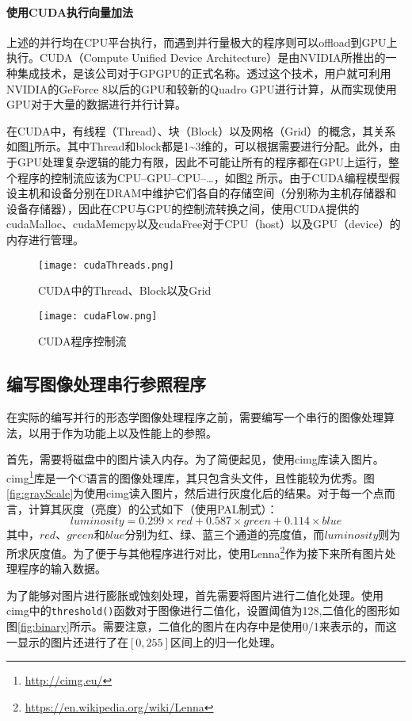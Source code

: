 \paragraph{使用CUDA执行向量加法}
\label{par:shi_yong_cudazhi_xing_xiang_liang_jia_fa_}
\par 上述的并行均在CPU平台执行，而遇到并行量极大的程序则可以offload到GPU上执行。CUDA（Compute Unified Device Architecture）是由NVIDIA所推出的一种集成技术，是该公司对于GPGPU的正式名称。透过这个技术，用户就可利用NVIDIA的GeForce 8以后的GPU和较新的Quadro GPU进行计算，从而实现使用GPU对于大量的数据进行并行计算。
\par 在CUDA中，有线程（Thread）、块（Block）以及网格（Grid）的概念，其关系如图\ref{fig:cudaThreads}所示。其中Thread和block都是1\textasciitilde 3维的，可以根据需要进行分配。此外，由于GPU处理复杂逻辑的能力有限，因此不可能让所有的程序都在GPU上运行，整个程序的控制流应该为CPU--GPU--CPU--\ldots ，如图\ref{fig:cudaFlow} 所示。由于CUDA编程模型假设主机和设备分别在DRAM中维护它们各自的存储空间（分别称为主机存储器和设备存储器），因此在CPU与GPU的控制流转换之间，使用CUDA提供的cudaMalloc、cudaMemcpy以及cudaFree对于CPU（host）以及GPU（device）的内存进行管理。
\begin{figure}[htpb]
    \centering
    \texttt{[image: cudaThreads.png]}
    \caption{CUDA中的Thread、Block以及Grid}
    \label{fig:cudaThreads}
\end{figure}
\begin{figure}[htpb]
    \centering
    \texttt{[image: cudaFlow.png]}
    \caption{CUDA程序控制流}
    \label{fig:cudaFlow}
\end{figure}


\subsection{编写图像处理串行参照程序}
\label{sub:bian_xie_tu_xiang_chu_li_chuan_xing_can_zhao_cheng_xu_}
\par 在实际的编写并行的形态学图像处理程序之前，需要编写一个串行的图像处理算法，以用于作为功能上以及性能上的参照。
\par 首先，需要将磁盘中的图片读入内存。为了简便起见，使用cimg库读入图片。cimg\footnote{\url{http://cimg.eu/}}库是一个C语言的图像处理库，其只包含头文件，且性能较为优秀。图\ref{fig:grayScale}为使用cimg读入图片，然后进行灰度化后的结果。对于每一个点而言，计算其灰度（亮度）的公式如下（使用PAL制式）：
\[ luminosity = 0.299\times red + 0.587\times green + 0.114\times blue \]
其中，\(red\)、\(green\)和\(blue\)分别为红、绿、蓝三个通道的亮度值，而\(luminosity\)则为所求灰度值。为了便于与其他程序进行对比，使用Lenna\footnote{\url{https://en.wikipedia.org/wiki/Lenna}}作为接下来所有图片处理程序的输入数据。
\par 为了能够对图片进行膨胀或蚀刻处理，首先需要将图片进行二值化处理。使用cimg中的\lstinline{threshold()}函数对于图像进行二值化，设置阈值为128,二值化的图形如图\ref{fig:binary}所示。需要注意，二值化的图片在内存中是使用0/1来表示的，而这一显示的图片还进行了在\([0, 255]\)区间上的归一化处理。

